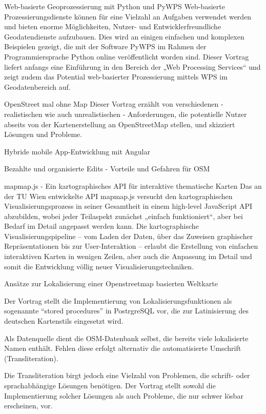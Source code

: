 %
{Web-basierte Geoprozessierung mit Python und PyWPS}%
{}%
{Web-basierte Prozessierungsdienste können für eine Vielzahl an Aufgaben verwendet werden und bieten enorme Möglichkeiten,
Nutzer- und Entwicklerfreundliche Geodatendienste aufzubauen. Dies wird an einigen einfachen und komplexen Beispielen gezeigt,
die mit der Software PyWPS im Rahmen der Programmiersprache Python online veröffentlicht worden sind.
Dieser Vortrag liefert anfangs eine Einführung in den Bereich der „Web Processing Services“ und zeigt
zudem das Potential web-basierter Prozessierung mittels WPS im Geodatenbereich auf. }

%
{OpenStreet mal ohne Map}%
{}%
{Dieser Vortrag erzählt von verschiedenen - realistischen wie auch unrealistischen - Anforderungen,
die potentielle Nutzer abseits von der Kartenerstellung an OpenStreetMap stellen, und skizziert Lösungen und Probleme.}

%
{Hybride mobile App-Entwicklung mit Angular}%
{}%
{}

%
{Bezahlte und organisierte Edits - Vorteile und Gefahren für OSM}%
{}%
{}

%
{mapmap.js - Ein kartographisches API für interaktive thematische Karten}%
{}%
{Das an der TU Wien entwickelte API mapmap.js versucht den kartographischen Visualisierungsprozess in seiner Gesamtheit in einem high-level JavaScript API abzubilden, wobei jeder Teilaspekt zunächst „einfach funktioniert“, aber bei Bedarf im Detail angepasst werden kann. Die kartographische Visualisierungspipeline – vom Laden der Daten, über das Zuweisen graphischer Repräsentationen bis zur User-Interaktion – erlaubt die Erstellung von einfachen interaktiven Karten in wenigen Zeilen, aber auch die Anpassung im Detail und somit die Entwicklung völlig neuer Visualisierungstechniken.}

%
{Ansätze zur Lokalisierung einer Openstreetmap basierten Weltkarte}%
{}%
{Der Vortrag stellt die Implementierung von Lokalisierungsfunktionen als sogenannte "`stored procedures"' in PostrgreSQL vor,
die zur Latinisierung des deutschen Kartenstils eingesetzt wird.

Als Datenquelle dient die OSM-Datenbank selbst, die bereits viele lokalisierte Namen enthält. Fehlen diese erfolgt alternativ
die automatisierte Umschrift (Transliteration).

Die Transliteration birgt jedoch eine Vielzahl von Problemen, die schrift- oder sprachabhängige Lösungen benötigen. Der Vortrag
stellt sowohl die Implementierung solcher Lösungen als auch Probleme, die nur schwer lösbar erscheinen, vor.}

